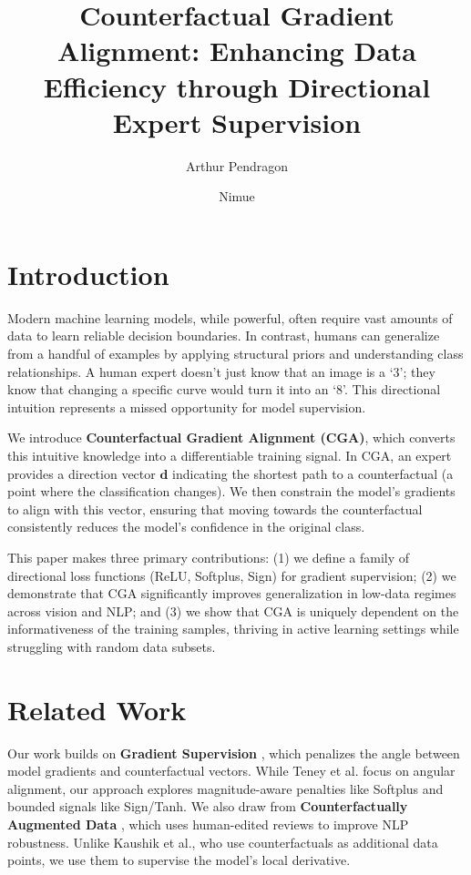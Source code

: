 \documentclass[sigconf,anonymous]{aamas}
\title[Counterfactual Gradient Alignment]{Counterfactual Gradient Alignment: Enhancing Data Efficiency through Directional Expert Supervision}
\author{Arthur Pendragon}
\affiliation{
  \institution{Camelot Castle}
  \city{Camelot}
  \country{United Kingdom}}
\author{Nimue}
\affiliation{
  \institution{The Lady's Lake}
  \city{Avalon}
  \country{United Kingdom}}
\begin{document}

\pagestyle{fancy}
\fancyhead{}


\maketitle 


\section{Introduction}
Modern machine learning models, while powerful, often require vast amounts of data to learn reliable decision boundaries. In contrast, humans can generalize from a handful of examples by applying structural priors and understanding class relationships. A human expert doesn't just know that an image is a `3'; they know that changing a specific curve would turn it into an `8'. This directional intuition represents a missed opportunity for model supervision.

We introduce \textbf{Counterfactual Gradient Alignment (CGA)}, which converts this intuitive knowledge into a differentiable training signal. In CGA, an expert provides a direction vector $\mathbf{d}$ indicating the shortest path to a counterfactual (a point where the classification changes). We then constrain the model's gradients to align with this vector, ensuring that moving towards the counterfactual consistently reduces the model's confidence in the original class.

This paper makes three primary contributions: (1) we define a family of directional loss functions (ReLU, Softplus, Sign) for gradient supervision; (2) we demonstrate that CGA significantly improves generalization in low-data regimes across vision and NLP; and (3) we show that CGA is uniquely dependent on the informativeness of the training samples, thriving in active learning settings while struggling with random data subsets.

\section{Related Work}
Our work builds on \textbf{Gradient Supervision} \cite{teney2020learning}, which penalizes the angle between model gradients and counterfactual vectors. While Teney et al. focus on angular alignment, our approach explores magnitude-aware penalties like Softplus and bounded signals like Sign/Tanh. We also draw from \textbf{Counterfactually Augmented Data} \cite{Kaushik2020Learning}, which uses human-edited reviews to improve NLP robustness. Unlike Kaushik et al., who use counterfactuals as additional data points, we use them to supervise the model's local derivative.
\end{document}
